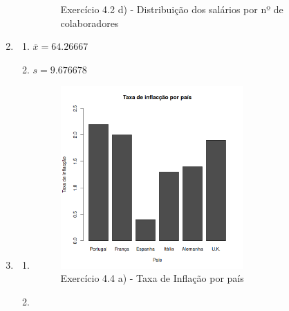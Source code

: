 \documentclass[11pt,a4paper]{article}
\begin{document}
\begin{enumerate}[label=\arabic{section}.\arabic*]
\begin{enumerate}[label=\alph*)]
\begin{figure}[h!]
				\caption{Exercício 4.2 d) - Distribuição dos salários por nº de colaboradores}
			\end{figure}
			
		\end{enumerate}
		\clearpage
		\item {}\hfill
		\begin{enumerate}[label=\alph*)]
		\item $\overline{x} = 64.26667$\hfill
			
		\item $s = 9.676678$\hfill
			
		\end{enumerate}
		\clearpage
	\item {}\hfill
		\begin{enumerate}[label=\alph*)]
		\item \hfill
			\begin{figure}[h!]
				\centering
				\includegraphics[width=0.7\textwidth]{./recursos/ex4_4a.png}
				\caption{Exercício 4.4 a) - Taxa de Inflação por país}
			\end{figure}
			
		\clearpage
		\item \hfill
			\begin{figure}[h!]
				\centering

\end{figure}
\end{enumerate}
\end{enumerate}
\end{document}
